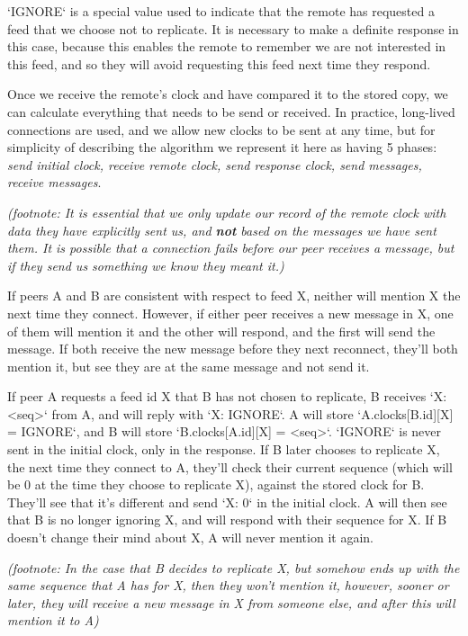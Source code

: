 \documentclass[sigconf]{acmart}
\begin{document}
`IGNORE` is a special value used to indicate that the remote has
requested a feed that we choose not to replicate.  It is necessary to
make a definite response in this case, because this enables the remote
to remember we are not interested in this feed, and so they will avoid
requesting this feed next time they respond.

Once we receive the remote's clock and have compared it to the stored
copy, we can calculate everything that needs to be send or
received. In practice, long-lived connections are used, and we allow
new clocks to be sent at any time, but for simplicity of describing
the algorithm we represent it here as having 5 phases: {\em send initial
clock, receive remote clock, send response clock, send messages,
receive messages}.

{\em (footnote: It is essential that we only update our record of the
  remote clock with data they have explicitly sent us, and {\bf not}
  based on the messages we have sent them. It is possible that a
  connection fails before our peer receives a message, but if they
  send us something we know they meant it.)}

If peers A and B are consistent with respect to feed X, neither will
mention X the next time they connect.  However, if either peer
receives a new message in X, one of them will mention it and the other
will respond, and the first will send the message. If both receive the
new message before they next reconnect, they'll both mention it, but
see they are at the same message and not send it.

If peer A requests a feed id X that B has not chosen to replicate, B
receives `X: <seq>` from A, and will reply with `X: IGNORE`.  A will
store `A.clocks[B.id][X] = IGNORE`, and B will store
`B.clocks[A.id][X] = <seq>`.  `IGNORE` is never sent in the initial
clock, only in the response. If B later chooses to replicate X, the
next time they connect to A, they'll check their current sequence
(which will be 0 at the time they choose to replicate X), against the
stored clock for B. They'll see that it's different and send `X: 0` in
the initial clock. A will then see that B is no longer ignoring X, and
will respond with their sequence for X. If B doesn't change their mind
about X, A will never mention it again.

{\em (footnote: In the case that B decides to replicate X, but somehow
  ends up with the same sequence that A has for X, then they won't
  mention it, however, sooner or later, they will receive a new
  message in X from someone else, and after this will mention it to A)}
\end{document}
